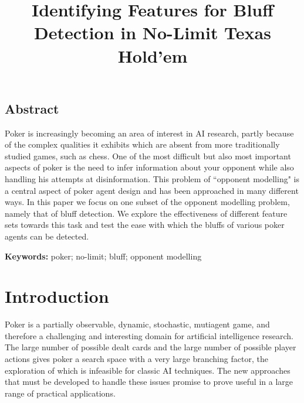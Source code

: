 \documentclass[letterpaper]{article}
\title{Identifying Features for Bluff Detection in No-Limit Texas Hold'em}
\begin{document}
\maketitle

\begin{adjustwidth}{10pt}{10pt}
\section{
\fontsize{10pt}{12pt} 
\selectfont 
Abstract}
\fontsize{9pt}{10pt}
\selectfont
Poker is increasingly becoming an area of interest in AI research, partly because of the complex qualities it exhibits which are absent from more traditionally studied games, such as chess. One of the most difficult but also most important aspects of poker is the need to infer information about your opponent while also handling his attempts at disinformation. This problem of ``opponent modelling" is a central aspect of poker agent design and has been approached in many different ways. In this paper we focus on one subset of the opponent modelling problem, namely that of bluff detection. We explore the effectiveness of different feature sets towards this task and test the ease with which the bluffs of various poker agents can be detected.

\smallskip
\noindent \textbf{Keywords:} poker; no-limit; bluff; opponent modelling
\end{adjustwidth}

\section{
\fontsize{12pt}{15pt} 
\selectfont
Introduction}
\fontsize{10pt}{12pt} 
\selectfont
Poker is a partially observable, dynamic, stochastic, mutiagent game, and therefore a challenging and interesting domain for artificial intelligence research. The large number of possible dealt cards and the large number of possible player actions gives poker a search space with a very large branching factor, the exploration of which is infeasible for classic AI techniques. The new approaches that must be developed to handle these issues promise to prove useful in a large range of practical applications.
\end{document}
